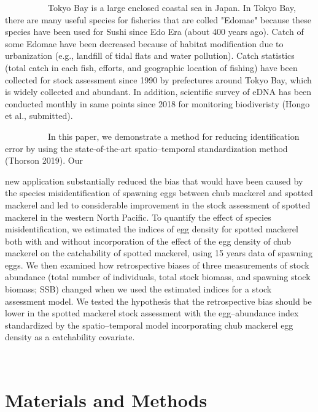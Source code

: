 \documentclass[12pt]{article}
\begin{document}
\begin{linenumbers}
\ \ \ \ \ \ \ \ \ \
Tokyo Bay is a large enclosed coastal sea in Japan. In Tokyo Bay, there are many useful species for fisheries that are colled "Edomae" because these species have been used for Sushi since Edo Era (about 400 years ago). Catch of some Edomae have been decreased because of habitat modification due to urbanization (e.g., landfill of tidal flats and water pollution). Catch statistics (total catch in each fish, efforts, and geographic location of fishing) have been collected for stock assessment since 1990 by prefectures around Tokyo Bay, which is widely collected and abundant.
In addition, scientific survey of eDNA has been conducted monthly in same points since 2018 for monitoring biodiveristy (Hongo et al., submitted).


\ \ \ \ \ \ \ \ \ \
In this paper, we demonstrate a method for reducing identification error by using the state-of-the-art spatio--temporal standardization method (Thorson 2019). Our {new application substantially reduced the bias that would have been caused by the species misidentification of spawning eggs between chub mackerel and spotted mackerel and led to considerable improvement in the stock assessment of spotted mackerel in the western North Pacific. To quantify the effect of species misidentification, we estimated the indices of egg density for spotted mackerel both with and without incorporation of the effect of the egg density of chub mackerel on the catchability of spotted mackerel, using 15 years data of spawning eggs. We then examined how retrospective biases of three measurements of stock abundance (total number of individuals, total stock biomass, and spawning stock biomass; SSB) changed when we used the estimated indices for a stock assessment model. We tested the hypothesis that the retrospective bias should be lower in the spotted mackerel stock assessment with the egg--abundance index standardized by the spatio--temporal model incorporating chub mackerel egg density as a catchability covariate.

\ \\

\section{Materials and Methods}
}
\end{linenumbers}
\end{document}
